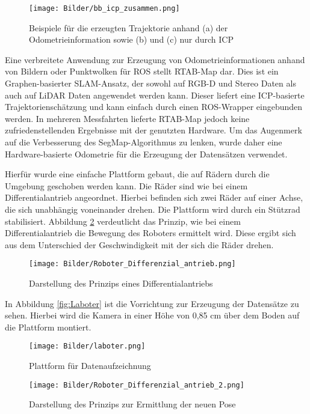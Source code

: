 \begin{figure}
	\centering
	\texttt{[image: Bilder/bb\_icp\_zusammen.png]}
	\caption{Beispiele für die erzeugten Trajektorie anhand (a) der Odometrieinformation sowie (b) und (c) nur durch ICP}
	\label{fig:ICP}
\end{figure}

Eine verbreitete Anwendung zur Erzeugung von Odometrieinformationen anhand von Bildern oder Punktwolken für ROS stellt RTAB-Map dar. Dies ist ein Graphen-basierter SLAM-Ansatz, der sowohl auf RGB-D und Stereo Daten als auch auf LiDAR Daten angewendet werden kann. Dieser liefert eine ICP-basierte Trajektorienschätzung und kann einfach durch einen ROS-Wrapper eingebunden werden. In mehreren Messfahrten lieferte RTAB-Map jedoch keine zufriedenstellenden Ergebnisse mit der genutzten Hardware. Um das Augenmerk auf die Verbesserung des SegMap-Algorithmus zu lenken, wurde daher eine Hardware-basierte Odometrie für die Erzeugung der Datensätzen verwendet. 

Hierfür wurde eine einfache Plattform gebaut, die auf Rädern durch die Umgebung geschoben werden kann. Die Räder sind wie bei einem Differentialantrieb angeordnet. Hierbei befinden sich zwei Räder auf einer Achse, die sich unabhängig voneinander drehen. Die Plattform wird durch ein Stützrad stabilisiert. Abbildung \ref{fig:Differentialantrieb} verdeutlicht das Prinzip, wie bei einem Differentialantrieb die Bewegung des Roboters ermittelt wird. Diese ergibt sich aus dem Unterschied der Geschwindigkeit mit der sich die Räder drehen. 

\begin{figure}
	\centering
	\texttt{[image: Bilder/Roboter\_Differenzial\_antrieb.png]}
	\caption{Darstellung des Prinzips eines Differentialantriebs}
	\label{fig:Differentialantrieb}
\end{figure}

In Abbildung \ref{fig:Laboter} ist die Vorrichtung zur Erzeugung der Datensätze zu sehen. Hierbei wird die Kamera in einer Höhe von 0,85 cm über dem Boden auf die Plattform montiert.

\begin{figure}
	\centering
	\begin {minipage}[t]{0.3\linewidth}
	\centering
	\texttt{[image: Bilder/laboter.png]}
	\caption{Plattform für Datenaufzeichnung }
	\label{fig:Laboter}
\end{minipage}
\hfill
 \begin{minipage}[t]{0.6\linewidth}
	\centering
	\texttt{[image: Bilder/Roboter\_Differenzial\_antrieb\_2.png]}
	\caption{Darstellung des Prinzips zur Ermittlung der neuen Pose }
	\label{fig:Odoemtrie}
\end{minipage}
\end{figure}


